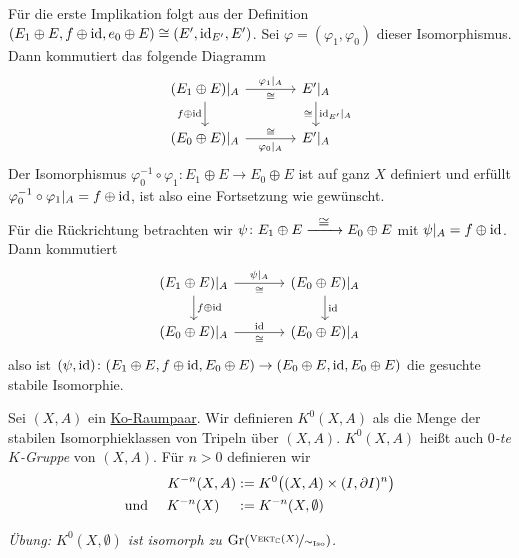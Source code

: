 \begin{beweis}
Für die erste Implikation folgt aus der Definition $(E_1 \oplus E, f \oplus \id, e_0 \oplus E) \cong \enbrace*{E', \id_{E'},E'}$. Sei $\varphi=(\varphi_1,\varphi_0)$ dieser 
Isomorphismus. Dann kommutiert das folgende Diagramm
\[
	\begin{tikzcd}[column sep=large]
		(E_1 \oplus E)|_A \rar["\varphi_1|_A","\cong"'] \dar["f \oplus \id"']& E'|_A \dar["\id_{E^\prime}\!|_A","\cong"'] \\
		(E_0 \oplus E)|_A \rar["\cong","\varphi_0|_A"'] & E'|_A
	\end{tikzcd}
\]
Der Isomorphismus $\varphi_0 ^{-1} \circ \varphi_1 \colon E_1 \oplus E \to E_0 \oplus E$ ist auf ganz $X$ definiert und erfüllt 
$\varphi_0 ^{-1} \circ \varphi_1 |_A = f \oplus \id$, ist also eine Fortsetzung wie gewünscht.

Für die Rückrichtung betrachten wir $\psi \colon E_1 \oplus E \xrightarrow{\minwidthbox{\raisebox{0pt}[0pt][0pt]{$\cong$}}{2em}} E_0 \oplus E$ mit $\psi|_A = f \oplus \id$. Dann kommutiert
\[
	\begin{tikzcd}[column sep=large]
		(E_1 \oplus E)|_A  \dar["f \oplus \id"] \rar["\psi|_A","\cong"']& (E_0 \oplus E)|_A \dar["\id"] \\
		(E_0 \oplus E)|_A \rar["\id","\cong"']& (E_0 \oplus E)|_A
	\end{tikzcd} 
\]	
also ist $(\psi,\id) \colon \enbrace*{E_1 \oplus E, f \oplus \id, E_0 \oplus E} \to \enbrace*{E_0 \oplus E, \id ,E_0 \oplus E}$ die gesuchte stabile Isomorphie.
\end{beweis}


\begin{definition}[{name=[$K^{-n}(X,A)$]},label=sub:32]
Sei $(X,A)$ ein \hyperref[def_koraumpaar]{Ko-Raumpaar}. Wir definieren $K^0(X,A)$ als die Menge der stabilen Isomorphieklassen von Tripeln über $(X,A)$. 
$K^0(X,A)$ heißt auch \emph{$0$-te $K$-Gruppe} von $(X,A)$. Für $n>0$ definieren wir 
\begin{align*}
	K^{-n}(X,A) &:= K^0 \enbrace[\big]{(X,A) \times (I,\partial I)^n} \\
	\text{und } \quad K^{-n}(X)\hphantom{,A} &:= K^{-n}(X,\emptyset)
\end{align*}
\end{definition}
\noindent \emph{Übung: $K^0(X,\emptyset)$ ist isomorph zu $\Gr \enbrace*{\nicefrac{\VEKT_\mathds{C}(X)}{\sim_{\Iso}}}$.} 

